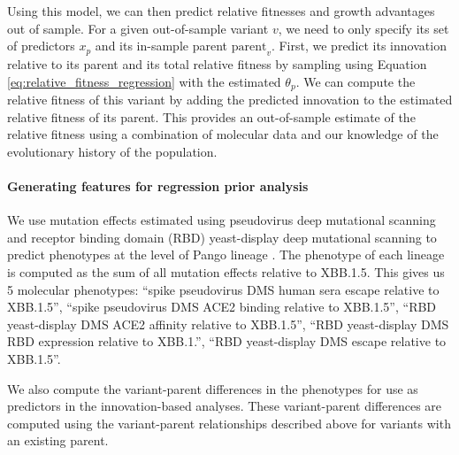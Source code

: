 Using this model, we can then predict relative fitnesses and growth advantages out of sample.
For a given out-of-sample variant $v$, we need to only specify its set of predictors $x_{p}$ and its in-sample parent $\text{parent}_v$.
First, we predict its innovation relative to its parent and its total relative fitness by sampling using Equation \ref{eq:relative_fitness_regression} with the estimated $\theta_{p}$.
We can compute the relative fitness of this variant by adding the predicted innovation to the estimated relative fitness of its parent.
This provides an out-of-sample estimate of the relative fitness using a combination of molecular data and our knowledge of the evolutionary history of the population.

%

\paragraph{Generating features for regression prior analysis}%

We use mutation effects estimated using pseudovirus deep mutational scanning and receptor binding domain (RBD) yeast-display deep mutational scanning to predict phenotypes at the level of Pango lineage \cite{Dadonaite2023, Taylor2023}.
The phenotype of each lineage is computed as the sum of all mutation effects relative to XBB.1.5.
This gives us 5 molecular phenotypes: ``spike pseudovirus DMS human sera escape relative to XBB.1.5'', ``spike pseudovirus DMS ACE2 binding relative to XBB.1.5'', ``RBD yeast-display DMS ACE2 affinity relative to XBB.1.5'', ``RBD yeast-display DMS RBD expression relative to XBB.1.'', ``RBD yeast-display DMS escape relative to XBB.1.5''.

We also compute the variant-parent differences in the phenotypes for use as predictors in the innovation-based analyses. 
These variant-parent differences are computed using the variant-parent relationships described above for variants with an existing parent.

